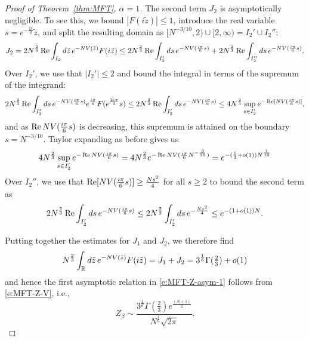\documentclass[11pt]{amsart}
\numberwithin{equation}{section}
\numberwithin{theorem}{section}
\begin{document}
\begin{proof}[Proof of Theorem~\ref{thm:MFT}, $\alpha=1$]
The second term $J_2$ is asymptotically negligible.
To see this, we bound $|F(i\tilde{z})| \le 1$, introduce the real
variable  $s = e^{-\frac{i\pi}{6}}\tilde{z}$, and split the resulting domain as $ [N^{-3/10},2) \cup [2,\infty) = I_2' \cup I_2''$:
\begin{equation}
J_2 = 2 N^{\frac{2}{3}}\operatorname{Re}\int_{I_2} d\tilde z\, e^{-NV(\tilde z)} F(i\tilde z) \le   2 N^{\frac{2}{3}}\operatorname{Re}\int_{I_2'} ds\, e^{-NV(\frac{i\pi}{6} s)} 
+2 N^{\frac{2}{3}}\operatorname{Re}\int_{I_2''} ds\, e^{-NV(\frac{i\pi}{6} s)}
.
\end{equation}
Over $I_2'$, we use that $|I_2'| \le 2$ and bound the integral in
terms of the supremum of the integrand:
\begin{equation}
2 N^{\frac{2}{3}}\operatorname{Re}\int_{I_2'} ds\, e^{-NV(\frac{i\pi}{6} s)} e^{\frac{i\pi}{6}}F(e^{\frac{2i\pi}{3}}s) \le 2 N^{\frac{2}{3}}\operatorname{Re}\int_{I_2'} ds\, e^{-NV(\frac{i\pi}{6} s)}
\le 4 N^{\frac{2}{3}}\sup_{s \in I_2'} e^{-\operatorname{Re} [NV(\frac{i\pi}{6} s)]},
\end{equation}
and as $\operatorname{Re} NV(\frac{i\pi}{6} s)$ is decreasing, this supremum is attained on the boundary $s = N^{-3/10}$. Taylor expanding as before gives us 
\begin{equation}
4 N^{\frac{2}{3}}\sup_{s \in I_2'} e^{-\operatorname{Re} NV(\frac{i\pi}{6} s)} = 4 N^{\frac{2}{3}}e^{-\operatorname{Re} NV(\frac{i\pi}{6}N^{-\frac{3}{10}})}=e^{-(\frac{1}{3} + o(1))N^{\frac{1}{10}}}
\end{equation}
Over $I_2''$, we use that $\operatorname{Re} [NV(\frac{i\pi}{6} s)] \ge \frac{Ns^2}{4}$ for all $s \ge 2$ to bound the second term as
\begin{equation}
2 N^{\frac{2}{3}}\operatorname{Re}\int_{I_2'} ds\, e^{-NV(\frac{i\pi}{6} s)} \le 2 N^{\frac{2}{3}}\int_{I_2'} ds\, e^{-\frac{Ns^2}{4}} \le e^{-(1+o(1))N}.
\end{equation}

Putting together the estimates for $J_1$ and $J_2$, we therefore find
\begin{equation}
 N^{\frac{2}{3}}\int_{\mathbb{R}} d\tilde z\, e^{-NV(\tilde z)} F(i\tilde z) = J_1 + J_2 = 3^{\frac{1}{6}}\Gamma(\tfrac{2}{3}) + o(1)
\end{equation}
and hence the first asymptotic relation in \eqref{e:MFT-Z-asym-1}
follows from \eqref{e:MFT-Z-V}, i.e.,
\begin{equation}
Z_\beta \sim \frac{3^{\frac{1}{6}}\Gamma\left(\frac{2}{3}\right)e^{\frac{(N+1)}{2}}}{N^{\frac{1}{6}}\sqrt{2\pi}}.
\end{equation}



\end{proof}
\end{document}
